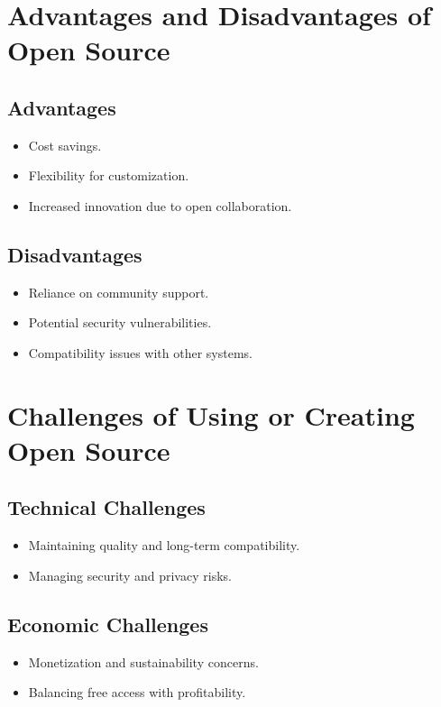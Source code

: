 
\section{Advantages and Disadvantages of Open Source}
\subsection{Advantages}

\begin{itemize}
    \item Cost savings.
    \item Flexibility for customization.
    \item Increased innovation due to open collaboration.
\end{itemize}

\subsection{Disadvantages}

\begin{itemize}
    \item Reliance on community support.
    \item Potential security vulnerabilities.
    \item Compatibility issues with other systems.
\end{itemize}

\section{Challenges of Using or Creating Open Source}
\subsection{Technical Challenges}

\begin{itemize}
    \item Maintaining quality and long-term compatibility.
    \item Managing security and privacy risks.
\end{itemize}
\subsection{Economic Challenges}

\begin{itemize}
    \item Monetization and sustainability concerns.
    \item Balancing free access with profitability.
\end{itemize}
